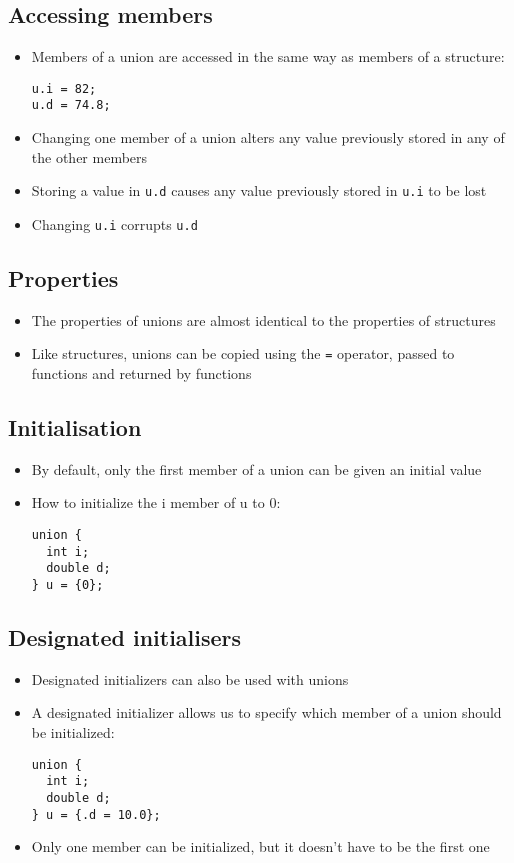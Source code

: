 \documentclass{article}
\begin{document}
\subsection{Accessing members}
\begin{itemize}
\item Members of a union are accessed in the same way as members of a structure:
\begin{verbatim}
u.i = 82;
u.d = 74.8;
\end{verbatim}
\item Changing one member of a union alters any value previously stored in any of the other members
\item Storing a value in \verb!u.d! causes any value previously stored in \verb!u.i! to be lost
\item Changing \verb!u.i! corrupts \verb!u.d!
\end{itemize}



\subsection{Properties}
\begin{itemize}
\item The properties of unions are almost identical to the properties of structures

\item Like structures, unions can be copied using the \verb!=! operator, passed to functions and returned by functions
\end{itemize}



\subsection{Initialisation}
\begin{itemize}
\item By default, only the first member of a union can be given an initial value
\item How to initialize the i member of u to 0:
\begin{verbatim}
union {
  int i;
  double d;
} u = {0};
\end{verbatim}
\end{itemize}



\subsection{Designated initialisers}
\begin{itemize}
\item Designated initializers can also be used with unions
\item A designated initializer allows us to specify which member of a union should be initialized:
\begin{verbatim}
union {
  int i;
  double d;
} u = {.d = 10.0};
\end{verbatim}
\item Only one member can be initialized, but it doesn't have to be the first one
\end{itemize}
\end{document}
